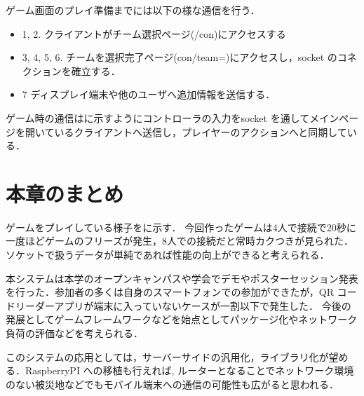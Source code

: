 ゲーム画面のプレイ準備までには以下の様な通信を行う．

\begin{itemize}
    \item 1, 2. クライアントがチーム選択ページ(/con)にアクセスする
    \item 3, 4, 5, 6. チームを選択完了ページ(con/team=)にアクセスし，socket のコネクションを確立する．
    \item 7 ディスプレイ端末や他のユーザへ追加情報を送信する．
\end{itemize}

ゲーム時の通信はに示すようにコントローラの入力をsocket を通してメインページを開いているクライアントへ送信し，プレイヤーのアクションへと同期している．



\newpage

\section{本章のまとめ}
ゲームをプレイしている様子をに示す．
今回作ったゲームは4人で接続で20秒に一度ほどゲームのフリーズが発生，8人での接続だと常時カクつきが見られた．ソケットで扱うデータが単純であれば性能の向上ができると考えられる．

本システムは本学のオープンキャンパスや学会でデモやポスターセッション発表を行った．参加者の多くは自身のスマートフォンでの参加ができたが，QR コードリーダーアプリが端末に入っていないケースが一割以下で発生した．
今後の発展としてゲームフレームワークなどを始点としてパッケージ化やネットワーク負荷の評価などを考えられる．


このシステムの応用としては，サーバーサイドの汎用化，ライブラリ化が望める．RaspberryPI への移植も行えれば, ルーターとなることでネットワーク環境のない被災地などでもモバイル端末への通信の可能性も広がると思われる．

\newpage
